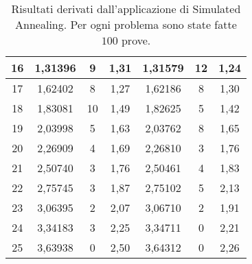 \begin{table}[]
{\begin{tabular}{|c|c|c|c|c|c|c|}
16 & 1,31396        & 9               & 1,31                & 1,31579          & 12              & 1,24                \\ \hline
17 & 1,62402        & 8               & 1,27                & 1,62186          & 8               & 1,30                \\ \hline
18 & 1,83081        & 10              & 1,49                & 1,82625          & 5               & 1,42                \\ \hline
19 & 2,03998        & 5               & 1,63                & 2,03762          & 8               & 1,65                \\ \hline
20 & 2,26909        & 4               & 1,69                & 2,26810          & 3               & 1,76                \\ \hline
21 & 2,50740        & 3               & 1,76                & 2,50461          & 4               & 1,83                \\ \hline
22 & 2,75745        & 3               & 1,87                & 2,75102          & 5               & 2,13                \\ \hline
23 & 3,06395        & 2               & 2,07                & 3,06710          & 2               & 1,91                \\ \hline
24 & 3,34183        & 3               & 2,25                & 3,34711          & 0               & 2,21                \\ \hline
25 & 3,63938        & 0               & 2,50                & 3,64312          & 0               & 2,26                \\ \hline
\end{tabular}
}
\caption{Risultati derivati dall'applicazione di Simulated Annealing. Per ogni problema sono state fatte $100$ prove.}
\label{table:sa}
\end{table}